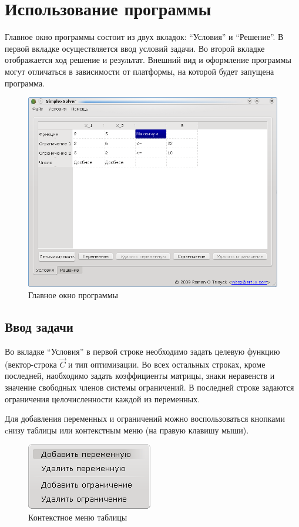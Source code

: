 
\chapter{Использование программы}
Главное окно программы состоит из двух вкладок: “Условия” и “Решение”.
В первой вкладке осуществляется ввод условий задачи. Во второй вкладке отображается ход решение и результат.
Внешний вид и оформление программы могут отличаться в зависимости от платформы, на которой будет запущена программа.

\begin{figure}[ht]
\centering
\includegraphics[width=\textwidth]{img/mainwindow.png}
\caption{Главное окно программы}
\end{figure}
\clearpage

\section{Ввод задачи}
Во вкладке “Условия” в первой строке необходимо задать целевую функцию (вектор-строка $\vec{C}$ и тип оптимизации.
Во всех остальных строках, кроме последней, наобходимо задать коэффициенты матрицы, знаки неравенств и значение свободных членов системы ограничений. В последней строке задаются ограничения целочисленности каждой из переменных.

Для добавления переменных и ограничений можно воспользоваться кнопками cнизу таблицы или контекстным меню (на правую клавишу мыши).
\begin{figure}[ht]
\centering
\includegraphics[scale=1.0]{img/contextmenu.png}
\caption{Контекстное меню таблицы}
\end{figure}

